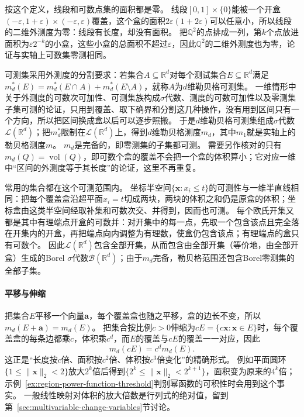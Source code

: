 按这个定义，线段和可数点集的面积都是零。
线段$[0,1]\times\{0\}$能被一个开盒$(-\varepsilon,1+\varepsilon)\times(-\varepsilon,\varepsilon)$覆盖，这个盒的面积$2\varepsilon(1+2\varepsilon)$可以任意小，所以线段的二维外测度为零：线段有长度，却没有面积。
把$\mathbb Q^2$的点排成一列，第$k$个点放进面积为$\varepsilon2^{-k}$的小盒，这些小盒的总面积不超过$\varepsilon$，因此$\mathbb Q^2$的二维外测度也为零，论证与实轴上可数集零测相同。

可测集采用外测度的分割要求：若集合$A\subseteq\mathbb R^d$对每个测试集合$E\subseteq\mathbb R^d$满足
$m_d^*(E)=m_d^*(E\cap A)+m_d^*(E\setminus A)$，就称$A$为$d$维勒贝格可测集。
一维情形中关于外测度的可数次可加性、可测集族构成$\sigma$代数、测度的可数可加性以及零测集子集可测的论证，只用到覆盖、取下确界和分割这几种操作，没有用到区间只有一个方向，所以把区间换成盒以后可以逐步照搬。
于是$d$维勒贝格可测集组成$\sigma$代数$\mathcal L(\mathbb R^d)$；把$m_d^*$限制在$\mathcal L(\mathbb R^d)$上，得到$d$维勒贝格测度$m_d$，其中$m_1$就是实轴上的勒贝格测度$m$。
$m_d$是完备的，即零测集的子集都可测。
需要另作核对的只有$m_d(Q)=\operatorname{vol}(Q)$，即可数个盒的覆盖不会把一个盒的体积算小；它对应一维中“区间的外测度等于其长度”的论证，这里不再重复。

常用的集合都在这个可测范围内。
坐标半空间$\{\bm x:x_i\leq t\}$的可测性与一维半直线相同：把每个覆盖盒沿超平面$x_i=t$切成两块，两块的体积之和仍是原盒的体积；坐标盒由这类半空间经取补集和可数次交、并得到，因而也可测。
每个欧氏开集又都是其中有理端点开盒的可数并：对开集中的每一点，先取一个包含该点且完全落在开集内的开盒，再把端点向内调整为有理数，使盒仍包含该点；有理端点的盒只有可数个。
因此$\mathcal L(\mathbb R^d)$包含全部开集，从而包含由全部开集（等价地，由全部开盒）生成的Borel $\sigma$代数$\mathcal B(\mathbb R^d)$；由于$m_d$完备，勒贝格范围还包含Borel零测集的全部子集。

\paragraph{平移与伸缩}

把集合$E$平移一个向量$\bm a$，每个覆盖盒也随之平移，盒的边长不变，所以$m_d(E+\bm a)=m_d(E)$。
把集合按比例$c>0$伸缩为$cE=\{c\bm x:\bm x\in E\}$时，每个覆盖盒的每条边都乘$c$，体积乘$c^d$，而$E$的覆盖与$cE$的覆盖一一对应，因此
\[
 m_d(cE)=c^dm_d(E).
\]
这正是“长度按$c$倍、面积按$c^2$倍、体积按$c^3$倍变化”的精确形式。
例如平面圆环$\{1\leq\lVert\bm x\rVert_2<2\}$放大$2^k$倍后得到$\{2^k\leq\lVert\bm x\rVert_2<2^{k+1}\}$，面积变为原来的$4^k$倍；示例~\ref{ex:region-power-function-threshold}判别幂函数的可积性时会用到这个事实。
一般线性映射对体积的放大倍数是行列式的绝对值，留到第~\ref{sec:multivariable-change-variables}节讨论。

